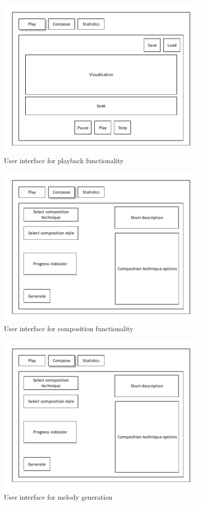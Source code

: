 \begin{figure}
\centerline{\includegraphics[width=400px]{../images/ui_play.pdf}}
\caption{User interface for playback functionality}
\label{ims:uiplay}
\end{figure}

\begin{figure}
\centerline{\includegraphics[width=400px]{../images/ui_compose.pdf}}
\caption{User interface for composition functionality}
\label{ims:uicompose}
\end{figure}

\begin{figure}
\centerline{\includegraphics[width=400px]{../images/ui_melody.pdf}}
\caption{User interface for melody generation}
\label{ims:uicompose}
\end{figure}


